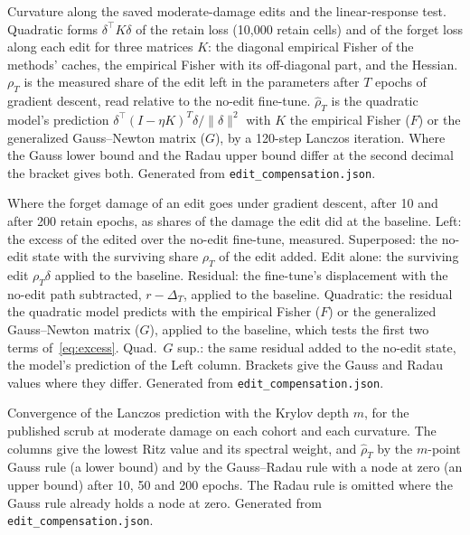 \documentclass{article}
\begin{document}
\begin{table}[h]
\centering
\caption{Curvature along the saved moderate-damage edits and the linear-response test. Quadratic forms $\delta^\top K \delta$ of the retain loss (10,000 retain cells) and of the forget loss along each edit for three matrices $K$: the diagonal empirical Fisher of the methods' caches, the empirical Fisher with its off-diagonal part, and the Hessian. $\rho_T$ is the measured share of the edit left in the parameters after $T$ epochs of gradient descent, read relative to the no-edit fine-tune. $\hat\rho_T$ is the quadratic model's prediction $\delta^\top (I - \eta K)^T \delta / \|\delta\|^2$ with $K$ the empirical Fisher ($F$) or the generalized Gauss--Newton matrix ($G$), by a 120-step Lanczos iteration. Where the Gauss lower bound and the Radau upper bound differ at the second decimal the bracket gives both. Generated from \texttt{edit\_compensation.json}.}
\label{tab:edit_curvature}
\small
\resizebox{\textwidth}{!}{}
\end{table}

\begin{table}[h]
\centering
\caption{Where the forget damage of an edit goes under gradient descent, after 10 and after 200 retain epochs, as shares of the damage the edit did at the baseline. Left: the excess of the edited over the no-edit fine-tune, measured. Superposed: the no-edit state with the surviving share $\rho_T$ of the edit added. Edit alone: the surviving edit $\rho_T \delta$ applied to the baseline. Residual: the fine-tune's displacement with the no-edit path subtracted, $r - \Delta_T$, applied to the baseline. Quadratic: the residual the quadratic model predicts with the empirical Fisher ($F$) or the generalized Gauss--Newton matrix ($G$), applied to the baseline, which tests the first two terms of~\eqref{eq:excess}. Quad.\ $G$ sup.: the same residual added to the no-edit state, the model's prediction of the Left column. Brackets give the Gauss and Radau values where they differ. Generated from \texttt{edit\_compensation.json}.}
\label{tab:compensation}
\small
\resizebox{\textwidth}{!}{}
\end{table}

\begin{table}[h]
\centering
\caption{Convergence of the Lanczos prediction with the Krylov depth $m$, for the published scrub at moderate damage on each cohort and each curvature. The columns give the lowest Ritz value and its spectral weight, and $\hat\rho_T$ by the $m$-point Gauss rule (a lower bound) and by the Gauss--Radau rule with a node at zero (an upper bound) after 10, 50 and 200 epochs. The Radau rule is omitted where the Gauss rule already holds a node at zero. Generated from \texttt{edit\_compensation.json}.}
\label{tab:lanczos_convergence}
\small

\end{table}
\end{document}
